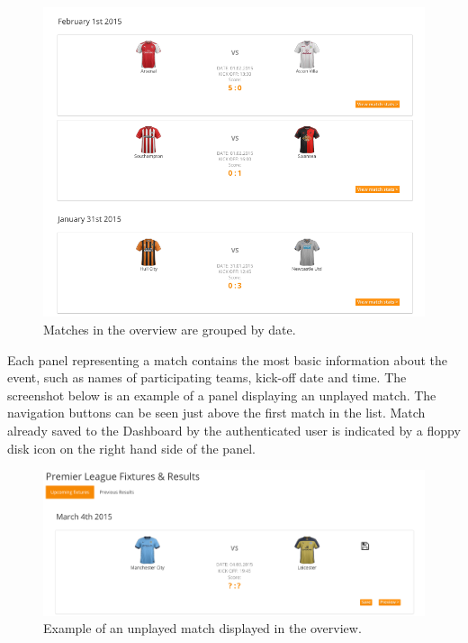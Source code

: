 \begin{figure}[H]
	\begin{center}
		\includegraphics[width=.90\linewidth,natwidth=610,natheight=642]{impl/images/matchesGrouped}
		\caption{Matches in the overview are grouped by date.} \label{fig:using:matchesgrouped}
	\end{center}
\end{figure}
 
Each panel representing a match contains the most basic information about the event, such as names of participating teams, kick-off date and time. The screenshot below is an example of a panel displaying an unplayed match. The navigation buttons can be seen just above the first match in the list. Match already saved to the Dashboard by the authenticated user is indicated by a floppy disk icon on the right hand side of the panel.

\begin{figure}[H]
	\begin{center}
		\includegraphics[width=.90\linewidth,natwidth=610,natheight=642]{impl/images/unplayedMatch}
		\caption{Example of an unplayed match displayed in the overview.} \label{fig:using:unplayedmatch}
	\end{center}
\end{figure}

